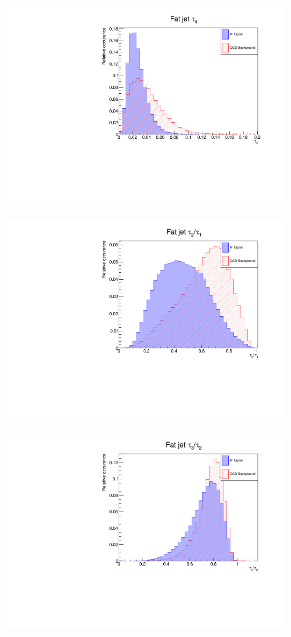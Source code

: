 \documentclass[main]{subfiles} %
\begin{document}
\begin{figure}[H]
\begin{subfigure}[h]{0.49\textwidth}
          \caption{}
         \label{fig:W_distribution_tau3}
     \end{subfigure}
     \begin{subfigure}[h]{0.49\textwidth}
         \centering
         \includegraphics[width=0.8\textwidth]{../Figures/Results/W_distributions/W_tau4_distribution.pdf}
          \caption{}
         \label{fig:W_distribution_tau4}
     \end{subfigure}
     \par\bigskip
     \begin{subfigure}[h]{0.49\textwidth}
         \centering
         \includegraphics[width=0.8\textwidth]{../Figures/Results/W_distributions/W_tau21_distribution.pdf}
          \caption{}
         \label{fig:W_distribution_tau21}
     \end{subfigure}
     \begin{subfigure}[h]{0.49\textwidth}
         \centering
         \includegraphics[width=0.8\textwidth]{../Figures/Results/W_distributions/W_tau32_distribution.pdf}

\end{subfigure}
\end{figure}
\end{document}
